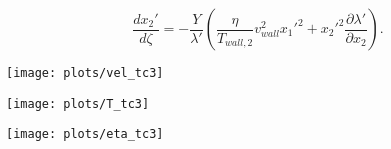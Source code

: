 \documentclass[12pt]{article}
\begin{document}
\begin{equation}
  \frac{d x_{2}'}{d \zeta} = -\frac{Y}{\lambda'}\left(\frac{\eta}{T_{wall,2}}v_{wall}^{2}x_{1}'^2+x_{2}'^{2}\frac{\partial \lambda'}{\partial x_{2}} \right).
\end{equation}

\begin{center}
\texttt{[image: plots/vel\_tc3]}
\end{center}
\begin{center}
\texttt{[image: plots/T\_tc3]}
\end{center}
\begin{center}
\texttt{[image: plots/eta\_tc3]}
\end{center}




\end{document}
